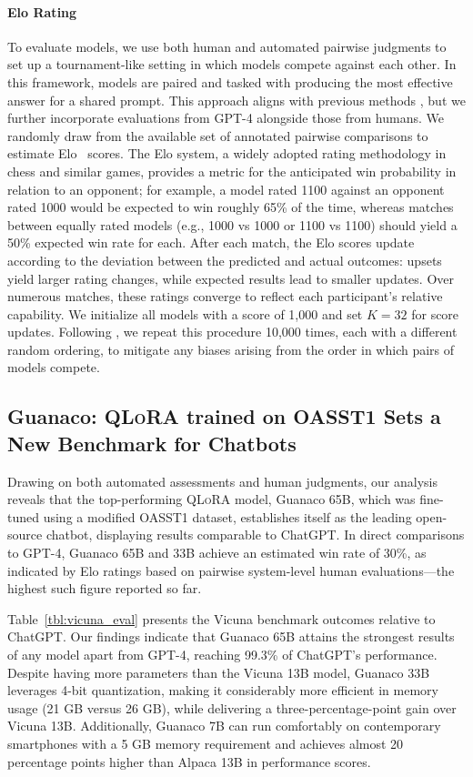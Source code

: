 \paragraph{Elo Rating} To evaluate models, we use both human and automated pairwise judgments to set up a tournament-like setting in which models compete against each other. In this framework, models are paired and tasked with producing the most effective answer for a shared prompt. This approach aligns with previous methods \citep{bai2022training, vicuna2023}, but we further incorporate evaluations from GPT-4 alongside those from humans. We randomly draw from the available set of annotated pairwise comparisons to estimate Elo~\citep{elo1967proposed,elo1978rating} scores. The Elo system, a widely adopted rating methodology in chess and similar games, provides a metric for the anticipated win probability in relation to an opponent; for example, a model rated 1100 against an opponent rated 1000 would be expected to win roughly 65\% of the time, whereas matches between equally rated models (e.g., 1000 vs 1000 or 1100 vs 1100) should yield a 50\% expected win rate for each. After each match, the Elo scores update according to the deviation between the predicted and actual outcomes: upsets yield larger rating changes, while expected results lead to smaller updates. Over numerous matches, these ratings converge to reflect each participant's relative capability. We initialize all models with a score of 1,000 and set $K=32$ for score updates. Following \citet{vicuna2023}, we repeat this procedure 10,000 times, each with a different random ordering, to mitigate any biases arising from the order in which pairs of models compete.

\subsection{\textbf{Guanaco}: \textsc{QLoRA} trained on OASST1 Sets a New Benchmark for Chatbots}

Drawing on both automated assessments and human judgments, our analysis reveals that the top-performing \textsc{QLoRA} model, {Guanaco} 65B, which was fine-tuned using a modified OASST1 dataset, establishes itself as the leading open-source chatbot, displaying results comparable to ChatGPT. In direct comparisons to GPT-4, {Guanaco} 65B and 33B achieve an estimated win rate of 30\%, as indicated by Elo ratings based on pairwise system-level human evaluations—the highest such figure reported so far.

Table~\ref{tbl:vicuna_eval} presents the Vicuna benchmark \cite{vicuna2023} outcomes relative to ChatGPT. Our findings indicate that {Guanaco} 65B attains the strongest results of any model apart from GPT-4, reaching 99.3\% of ChatGPT's performance. Despite having more parameters than the Vicuna 13B model, {Guanaco} 33B leverages 4-bit quantization, making it considerably more efficient in memory usage (21 GB versus 26 GB), while delivering a three-percentage-point gain over Vicuna 13B. Additionally, {Guanaco} 7B can run comfortably on contemporary smartphones with a 5 GB memory requirement and achieves almost 20 percentage points higher than Alpaca 13B in performance scores.

